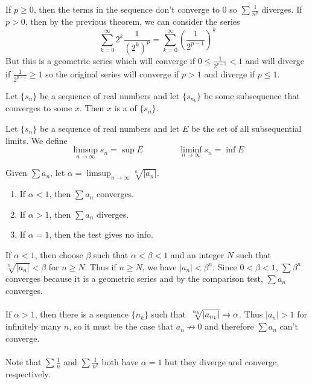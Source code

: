 \documentclass{mathnotes}
\begin{document}
\begin{pf}
  If $p\ge0$, then the terms in the sequence don't converge to 0 so
  $\sum\frac{1}{n^p}$ diverges. If $p>0$, then by the previous theorem, we can
  consider the series
  $$\sum_{k=0}^\infty2^k\frac{1}{(2^k)^p}
  =\sum_{k=0}^\infty(\frac{1}{2^{p-1}})^k$$
  But this is a geometric series which will converge if
  $0\le\frac{1}{2^{p-1}}<1$ and will diverge if $\frac{1}{2^{p-1}}\ge1$ so the
  original series will converge if $p>1$ and diverge if $p\le1$.
\end{pf}

\begin{defi}
  Let $\{s_n\}$ be a sequence of real numbers and let $\{s_{n_k}\}$ be some
  subsequence that converges to some $x$. Then $x$ is a  of $\{s_n\}$.
\end{defi}

\begin{defi}
  Let $\{s_n\}$ be a sequence of real numbers and let $E$ be the set of all
  subsequential limits. We define
  $$\limsup_{n\to\infty}s_n=\sup E\hspace{50pt}\liminf_{n\to\infty}s_n=\inf E$$
\end{defi}

\begin{thm}
  Given $\sum a_n$, let $\alpha=\limsup_{n\to\infty}\sqrt[n]{|a_n|}$.
  \begin{enumerate}
    \item If $\alpha<1$, then $\sum a_n$ converges.
    \item If $\alpha>1$, then $\sum a_n$ diverges.
    \item If $\alpha=1$, then the test gives no info.
  \end{enumerate}
\end{thm}

\begin{pf}
  If $\alpha<1$, then choose $\beta$ such that $\alpha<\beta<1$ and an integer
  $N$ such that $\sqrt[n]{|a_n|}<\beta$ for $n\ge N$. Thus if $n\ge N$, we have
  $|a_n|<\beta^n$. Since $0<\beta<1$, $\sum\beta^n$ converges because it is a
  geometric series and by the comparison test, $\sum a_n$ converges.\\\\
  If $\alpha>1$, then there is a sequence $\{n_k\}$ such that
  $\sqrt[\leftroot{-2}\uproot{3}n_k]{|a_{n_k}|}\to\alpha$. Thus $|a_n|>1$ for
  infinitely many $n$, so it must be the case that $a_n\not\to0$ and therefore
  $\sum a_n$ can't converge.\\\\
  Note that $\sum\frac{1}{n}$ and $\sum\frac{1}{n^2}$ both have $\alpha=1$ but
  they diverge and converge, respectively.
\end{pf}
\end{document}
